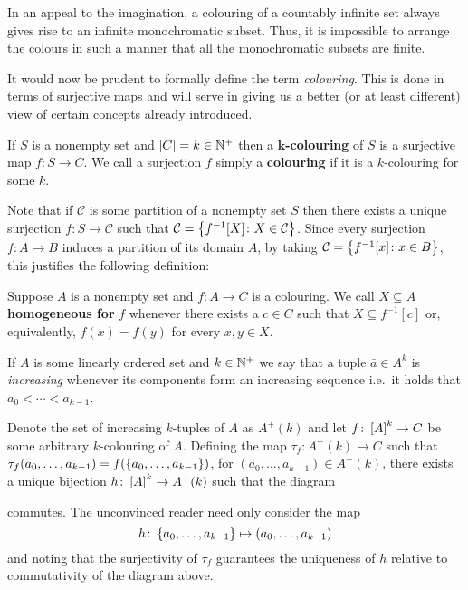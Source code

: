 In an appeal to the imagination, a colouring of a countably infinite set always
gives rise to an infinite monochromatic subset.  Thus, it is impossible to
arrange the colours in such a manner that all the monochromatic subsets are
finite.

It would now be prudent to formally define the term \textit{colouring}.  This is
done in terms of surjective maps and will serve in giving us a better (or at
least different) view of certain concepts already introduced.

\begin{dfn}[Colouring]\label{def:Col}
	If $S$ is a nonempty set and $\card{C}=k\in\posnats$ then a
	$\mathbf{k}$\textbf{-colouring} of $S$ is a surjective map $f\colon  S\to
	C$.  We call a surjection $f$ simply a \textbf{colouring} if it is a
	$k$-colouring for some $k$.
\end{dfn}

Note that if $\mathcal{C}$ is some partition of a nonempty set $S$ then there
exists a unique surjection $f\colon S\to \mathcal{C}$ such that
$\mathcal{C}=\setbuild{f^{-1}[X]}{X\in \mathcal{C}}$. Since every surjection
$f\colon A\to B$ induces a partition of its domain $A$, by taking
$\mathcal{C}=\setbuild{f^{-1}[x]}{x\in B}$, this justifies the following
definition:

\begin{dfn}
	Suppose $A$ is a nonempty set and $f\colon A\to C$ is a colouring.  We call
	$X\subseteq A$ \textbf{homogeneous for} $f$ whenever there exists a $c\in
	C$ such that $X\subseteq f^{-1}[c]$ or, equivalently, $f(x)=f(y)$ for every
	$x,y\in X$.
\end{dfn}

If $A$ is some linearly ordered set and $k\in\posnats$ we say that a tuple
$\bar{a}\in A^k$ is \textit{increasing} whenever its components form an
increasing sequence i.e.\ it holds that $a_0<\dotsb<a_{k-1}$.

Denote the set of increasing $k$-tuples of $A$ as $A^+(k)$ and let $f\colon
\subsets{k}{A}\to C$ be some arbitrary $k$-colouring of $A$.  Defining the map
$\tau_f\colon A^+(k)\to C$ such that
$\tau_f(a_0,\dotsc,a_{k-1})=f(\set{a_0,\dotsc,a_{k-1}})$, for
$(a_0,\dotsc,a_{k-1})\in A^+(k)$, there exists a unique bijection $h\colon
\subsets{k}{A}\to A^+(k)$ such that the diagram
\begin{center}
\end{center}
commutes.  The unconvinced reader need only consider the map
\begin{equation}
	h\colon\set{a_0,\dotsc,a_{k-1}}\mapsto(a_0,\dotsc,a_{k-1})
\end{equation}
and noting that the surjectivity of $\tau_f$ guarantees the uniqueness of $h$
relative to commutativity of the diagram above.

